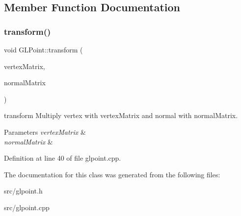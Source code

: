 \subsection{Member Function Documentation}
\mbox{\label{class_g_l_point_a1e65d4eb8478a28ea1ebe6bd98e26837}} 
\subsubsection{\texorpdfstring{transform()}{transform()}}
{\footnotesize\ttfamily void G\+L\+Point\+::transform (\begin{DoxyParamCaption}\item[{const Q\+Matrix4x4 \&}]{vertex\+Matrix,  }\item[{const Q\+Matrix4x4 \&}]{normal\+Matrix }\end{DoxyParamCaption})}



transform Multiply vertex with vertex\+Matrix and normal with normal\+Matrix. 


\begin{DoxyParams}{Parameters}
{\em vertex\+Matrix} & \\
\hline
{\em normal\+Matrix} & \\
\hline
\end{DoxyParams}


Definition at line 40 of file glpoint.\+cpp.



The documentation for this class was generated from the following files\+:\begin{DoxyCompactItemize}
\item 
src/glpoint.\+h\item 
src/glpoint.\+cpp\end{DoxyCompactItemize}
